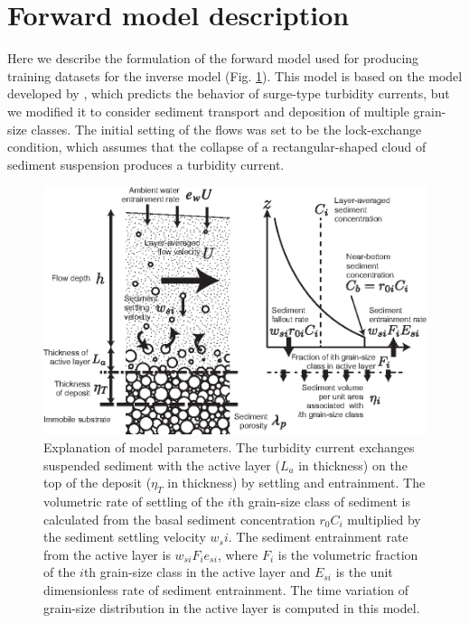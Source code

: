 
\section{Forward model description}

Here we describe the formulation of the forward model used for producing training datasets for the inverse model (Fig. \ref{fig:model_explanation}). This model is based on the model developed by \citet{kostic2006response}, which predicts the behavior of surge-type turbidity currents, but we modified it to consider sediment transport and deposition of multiple grain-size classes. The initial setting of the flows was set to be the lock-exchange condition, which assumes that the collapse of a rectangular-shaped cloud of sediment suspension produces a turbidity current.

\begin{figure}[t]
  \includegraphics[width=12cm]{fig02.eps}
  \caption{Explanation of model parameters. The turbidity current exchanges suspended sediment with the active layer ($L_{a}$ in thickness) on the top of the deposit ($\eta_T$ in thickness) by settling and entrainment. The volumetric rate of settling of the $i$th grain-size class of sediment is calculated from the basal sediment concentration $r_{0} C_i$ multiplied by the sediment settling velocity $w_{s}{i}$. The sediment entrainment rate from the active layer is $w_{si} F_i e_{si}$, where $F_i$ is the volumetric fraction of the $i$th grain-size class in the active layer and $E_{si}$ is the unit dimensionless rate of sediment entrainment. The time variation of grain-size distribution in the active layer is computed in this model.}
  \label{fig:model_explanation}
\end{figure}


